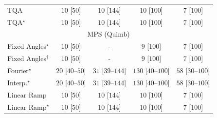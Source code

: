 \begin{tabular}{l|cccc|}
TQA & {\cellcolor[HTML]{F7FCF5}} \color[HTML]{000000} $10$ [$50$] & {\cellcolor[HTML]{F7FCF5}} \color[HTML]{000000} $10$ [$144$] & {\cellcolor[HTML]{F7FCF5}} \color[HTML]{000000} $10$ [$100$] & {\cellcolor[HTML]{F7FCF5}} \color[HTML]{000000} $7$ [$100$] \\
TQA$^\star$ & {\cellcolor[HTML]{F7FCF5}} \color[HTML]{000000} $10$ [$50$] & {\cellcolor[HTML]{F7FCF5}} \color[HTML]{000000} $10$ [$144$] & {\cellcolor[HTML]{F7FCF5}} \color[HTML]{000000} $10$ [$100$] & {\cellcolor[HTML]{F7FCF5}} \color[HTML]{000000} $7$ [$100$] \\
\cline{1-5}
\multicolumn{5}{c}{\rule{0pt}{8pt}MPS (Quimb)} \\
\midrule
Fixed Angles$^\star$ & {\cellcolor[HTML]{F7FCF5}} \color[HTML]{000000} $10$ [$50$] & {\cellcolor[HTML]{000000}} \color[HTML]{F1F1F1} {\cellcolor{white}} \color{black} - & {\cellcolor[HTML]{F7FCF5}} \color[HTML]{000000} $9$ [$100$] & {\cellcolor[HTML]{F7FCF5}} \color[HTML]{000000} $7$ [$100$] \\
Fixed Angles$^\dagger$ & {\cellcolor[HTML]{F7FCF5}} \color[HTML]{000000} $10$ [$50$] & {\cellcolor[HTML]{000000}} \color[HTML]{F1F1F1} {\cellcolor{white}} \color{black} - & {\cellcolor[HTML]{F7FCF5}} \color[HTML]{000000} $9$ [$100$] & {\cellcolor[HTML]{F7FCF5}} \color[HTML]{000000} $7$ [$100$] \\
Fourier$^\star$ & {\cellcolor[HTML]{F5FBF2}} \color[HTML]{000000} $20$ [$40$--$50$] & {\cellcolor[HTML]{F3FAF0}} \color[HTML]{000000} $31$ [$39$--$144$] & {\cellcolor[HTML]{DFF3DA}} \color[HTML]{000000} $130$ [$40$--$100$] & {\cellcolor[HTML]{EFF9EB}} \color[HTML]{000000} $58$ [$30$--$100$] \\
Interp.$^\star$ & {\cellcolor[HTML]{F5FBF2}} \color[HTML]{000000} $20$ [$40$--$50$] & {\cellcolor[HTML]{F3FAF0}} \color[HTML]{000000} $31$ [$39$--$144$] & {\cellcolor[HTML]{DFF3DA}} \color[HTML]{000000} $130$ [$40$--$100$] & {\cellcolor[HTML]{EFF9EB}} \color[HTML]{000000} $58$ [$30$--$100$] \\
Linear Ramp & {\cellcolor[HTML]{F7FCF5}} \color[HTML]{000000} $10$ [$50$] & {\cellcolor[HTML]{F7FCF5}} \color[HTML]{000000} $10$ [$144$] & {\cellcolor[HTML]{F7FCF5}} \color[HTML]{000000} $10$ [$100$] & {\cellcolor[HTML]{F7FCF5}} \color[HTML]{000000} $7$ [$100$] \\
Linear Ramp$^\star$ & {\cellcolor[HTML]{F7FCF5}} \color[HTML]{000000} $10$ [$50$] & {\cellcolor[HTML]{F7FCF5}} \color[HTML]{000000} $10$ [$144$] & {\cellcolor[HTML]{F7FCF5}} \color[HTML]{000000} $10$ [$100$] & {\cellcolor[HTML]{F7FCF5}} \color[HTML]{000000} $7$ [$100$] \\

\end{tabular}
